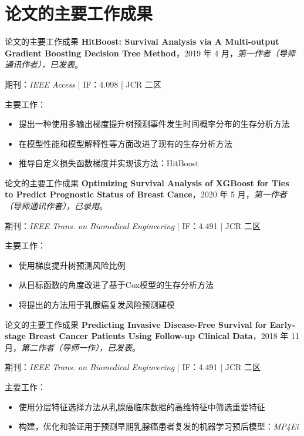 \documentclass[10pt]{beamer}
\begin{document}
\section{论文的主要工作成果}

\begin{frame}{论文的主要工作成果}
  \textbf{HitBoost: Survival Analysis via A Multi-output Gradient Boosting Decision Tree Method}，2019 年 4 月，\textit{第一作者（导师通讯作者），已发表}。

  期刊：\textit{IEEE Access} | IF：4.098 | JCR 二区

  主要工作：
  \begin{itemize}
    \item 提出一种使用多输出梯度提升树预测事件发生时间概率分布的生存分析方法
    \item 在模型性能和模型解释性等方面改进了现有的生存分析方法
    \item 推导自定义损失函数梯度并实现该方法：HitBoost
  \end{itemize}
\end{frame}

\begin{frame}{论文的主要工作成果}
  \textbf{Optimizing Survival Analysis of XGBoost for Ties to Predict Prognostic Status of Breast Cance}，2020 年 5 月，\textit{第一作者（导师通讯作者），已录用}。

  期刊：\textit{IEEE Trans. on Biomedical Engineering} | IF：4.491 | JCR 二区

  主要工作：
  \begin{itemize}
    \item 使用梯度提升树预测风险比例
    \item 从目标函数的角度改进了基于Cox模型的生存分析方法
    \item 将提出的方法用于乳腺癌复发风险预测建模
  \end{itemize}
\end{frame}

\begin{frame}{论文的主要工作成果}
  \textbf{Predicting Invasive Disease-Free Survival for Early-stage Breast Cancer Patients Using Follow-up Clinical Data}，2018 年 11 月，\textit{第二作者（导师一作），已发表}。

  期刊：\textit{IEEE Trans. on Biomedical Engineering} | IF：4.491 | JCR 二区

  主要工作：
  \begin{itemize}
    \item 使用分层特征选择方法从乳腺癌临床数据的高维特征中筛选重要特征
    \item 构建，优化和验证用于预测早期乳腺癌患者复发的机器学习预后模型：\textit{MP4Ei}
  \end{itemize}
\end{frame}
\end{document}
